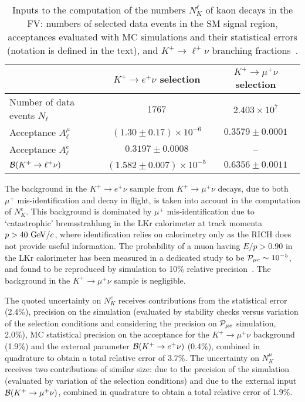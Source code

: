 \documentclass[11pt]{article}
\begin{document}
\begin{table}[tb]
\caption{Inputs to the computation of the numbers $N_K^\ell$ of kaon decays in the FV: numbers of selected data events in the SM signal region, acceptances evaluated with MC simulations and their statistical errors (notation is defined in the text), and $K^+\to\ell^+\nu$ branching fractions~\cite{pdg}.}
\begin{center}
\vspace{-9mm}
\begin{tabular}{lcc}
\hline
& $K^+\to e^+\nu$ selection & $K^+\to\mu^+\nu$ selection\\
\hline
Number of data events $N_\ell$ & 1767 & $2.403\times 10^{7}$\\
Acceptance $A^\mu_\ell$ & $(1.30\pm0.17)\times 10^{-6}$ & $0.3579\pm0.0001$ \\
Acceptance $A^e_\ell$ & $0.3197\pm0.0008$ & -- \\
${\cal B}(K^+\to\ell^+\nu)$ & $(1.582\pm0.007)\times 10^{-5}$ & $0.6356\pm0.0011$ \\
\hline
\end{tabular}
\end{center}
\vspace{-12mm}
\label{tab:flux}
\end{table}

The background in the $K^+\to e^+\nu$ sample from $K^+\to\mu^+\nu$ decays, due to both $\mu^+$ mis-identification and decay in flight, is taken into account in the computation of $N_K^e$. This background is dominated by $\mu^+$ mis-identification due to `catastrophic' bremsstrahlung in the LKr calorimeter at track momenta $p>40~{\rm GeV}/c$, where identification relies on calorimetry only as the RICH does not provide useful information. The probability of a muon having $E/p>0.90$ in the LKr calorimeter has been measured in a dedicated study to be ${\cal P}_{\mu e}\sim 10^{-5}$, and found to be reproduced by simulation to 10\% relative precision~\cite{la11}. The background in the $K^+\to\mu^+\nu$ sample is negligible.

The quoted uncertainty on $N_K^e$ receives contributions from the statistical error (2.4\%), precision on the simulation (evaluated by stability checks versus variation of the selection conditions and considering the precision on ${\cal P}_{\mu e}$ simulation, 2.0\%), MC statistical precision on the acceptance for the $K^+\to\mu^+\nu$ background (1.9\%) and the external parameter ${\cal B}(K^+\to e^+\nu)$ (0.4\%), combined in quadrature to obtain a total relative error of 3.7\%. The uncertainty on $N_K^\mu$ receives two contributions of similar size: due to the precision of the simulation (evaluated by variation of the selection conditions) and due to the external input ${\cal B}(K^+\to \mu^+\nu)$, combined in quadrature to obtain a total relative error of 1.9\%.
\end{document}
